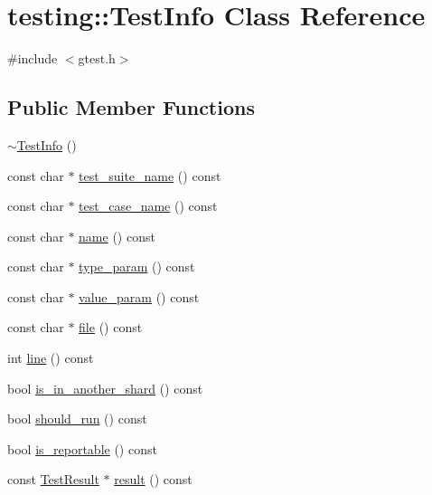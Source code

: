 \hypertarget{classtesting_1_1_test_info}{}\section{testing\+::Test\+Info Class Reference}
\label{classtesting_1_1_test_info}


{\ttfamily \#include $<$gtest.\+h$>$}

\subsection*{Public Member Functions}
\begin{DoxyCompactItemize}
\item 
\mbox{\hyperlink{classtesting_1_1_test_info_a8d382c1b1b511f0d9112c14684809852}{$\sim$\+Test\+Info}} ()
\item 
const char $\ast$ \mbox{\hyperlink{classtesting_1_1_test_info_a82a84ffd0e4d18eb5a3f97a2077e12cc}{test\+\_\+suite\+\_\+name}} () const
\item 
const char $\ast$ \mbox{\hyperlink{classtesting_1_1_test_info_a036a20710c8c2252889544daba9a8ff9}{test\+\_\+case\+\_\+name}} () const
\item 
const char $\ast$ \mbox{\hyperlink{classtesting_1_1_test_info_ac2581b45eccc9a3b94cb41c4807d0e34}{name}} () const
\item 
const char $\ast$ \mbox{\hyperlink{classtesting_1_1_test_info_a7759bc57f4350ad406cbbb0b3bcea320}{type\+\_\+param}} () const
\item 
const char $\ast$ \mbox{\hyperlink{classtesting_1_1_test_info_abdf2c6cfcf4819e725816c64e1c1fc24}{value\+\_\+param}} () const
\item 
const char $\ast$ \mbox{\hyperlink{classtesting_1_1_test_info_a9b74d79cf618ce5bb0d0b1da75ee8b35}{file}} () const
\item 
int \mbox{\hyperlink{classtesting_1_1_test_info_af5931cfc594b5d660c56b3c61c41ea13}{line}} () const
\item 
bool \mbox{\hyperlink{classtesting_1_1_test_info_a8621f2cf7623fd1609db8e324f0c2fec}{is\+\_\+in\+\_\+another\+\_\+shard}} () const
\item 
bool \mbox{\hyperlink{classtesting_1_1_test_info_a866e33b5bc5ab2a6e5375fc7d3af0f96}{should\+\_\+run}} () const
\item 
bool \mbox{\hyperlink{classtesting_1_1_test_info_a63e7042028b0b846f4b5a1e5bcffc079}{is\+\_\+reportable}} () const
\item 
const \mbox{\hyperlink{classtesting_1_1_test_result}{Test\+Result}} $\ast$ \mbox{\hyperlink{classtesting_1_1_test_info_aee8cb884c95cd446129aba936b4159e0}{result}} () const

\end{DoxyCompactItemize}

